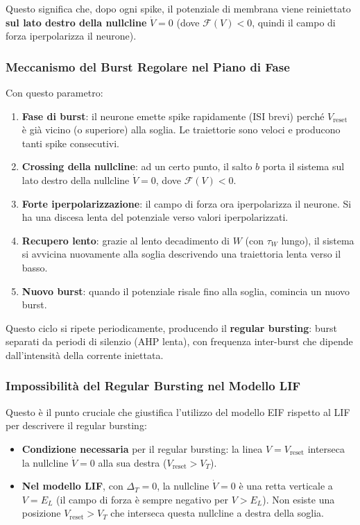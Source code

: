 Questo significa che, dopo ogni spike, il potenziale di membrana viene reiniettato \textbf{sul lato destro della nullcline} $\dot{V} = 0$ (dove $\mathcal{F}(V) < 0$, quindi il campo di forza iperpolarizza il neurone).

\subsubsection{Meccanismo del Burst Regolare nel Piano di Fase}

Con questo parametro:

\begin{enumerate}
    \item \textbf{Fase di burst}: il neurone emette spike rapidamente (ISI brevi) perché $V_{\text{reset}}$ è già vicino (o superiore) alla soglia. Le traiettorie sono veloci e producono tanti spike consecutivi.
    \item \textbf{Crossing della nullcline}: ad un certo punto, il salto $b$ porta il sistema sul lato destro della nullcline $\dot{V} = 0$, dove $\mathcal{F}(V) < 0$.
    \item \textbf{Forte iperpolarizzazione}: il campo di forza ora iperpolarizza il neurone. Si ha una discesa lenta del potenziale verso valori iperpolarizzati.
    \item \textbf{Recupero lento}: grazie al lento decadimento di $W$ (con $\tau_W$ lungo), il sistema si avvicina nuovamente alla soglia descrivendo una traiettoria lenta verso il basso.
    \item \textbf{Nuovo burst}: quando il potenziale risale fino alla soglia, comincia un nuovo burst.
\end{enumerate}

Questo ciclo si ripete periodicamente, producendo il \textbf{regular bursting}: burst separati da periodi di silenzio (AHP lenta), con frequenza inter-burst che dipende dall'intensità della corrente iniettata.

\subsubsection{Impossibilità del Regular Bursting nel Modello LIF}

Questo è il punto cruciale che giustifica l'utilizzo del modello EIF rispetto al LIF per descrivere il regular bursting:

\begin{itemize}
    \item \textbf{Condizione necessaria} per il regular bursting: la linea $V = V_{\text{reset}}$ interseca la nullcline $\dot{V} = 0$ alla sua destra ($V_{\text{reset}} > V_T$).
    \item \textbf{Nel modello LIF}, con $\Delta_T = 0$, la nullcline $\dot{V} = 0$ è una retta verticale a $V = E_L$ (il campo di forza è sempre negativo per $V > E_L$). Non esiste una posizione $V_{\text{reset}} > V_T$ che interseca questa nullcline a destra della soglia.
\end{itemize}

